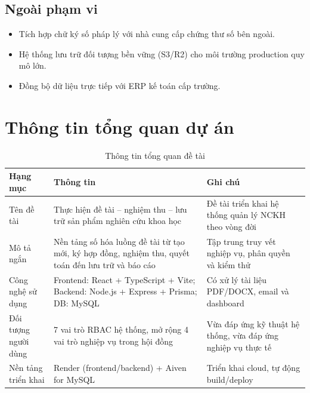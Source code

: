 \documentclass[12pt,a4paper]{report}
\begin{document}
\subsection{Ngoài phạm vi}
\begin{itemize}[leftmargin=1.2cm]
\item Tích hợp chữ ký số pháp lý với nhà cung cấp chứng thư số bên ngoài.
\item Hệ thống lưu trữ đối tượng bền vững (S3/R2) cho môi trường production quy mô lớn.
\item Đồng bộ dữ liệu trực tiếp với ERP kế toán cấp trường.
\end{itemize}

\section{Thông tin tổng quan dự án}
\begin{table}[H]
\centering
\begin{tabular}{|L{3.2cm}|L{5.0cm}|L{5.2cm}|}
\hline
\textbf{Hạng mục} & \textbf{Thông tin} & \textbf{Ghi chú} \\ \hline
Tên đề tài & Thực hiện đề tài -- nghiệm thu -- lưu trữ sản phẩm nghiên cứu khoa học & Đề tài triển khai hệ thống quản lý NCKH theo vòng đời \\ \hline
Mô tả ngắn & Nền tảng số hóa luồng đề tài từ tạo mới, ký hợp đồng, nghiệm thu, quyết toán đến lưu trữ và báo cáo & Tập trung truy vết nghiệp vụ, phân quyền và kiểm thử \\ \hline
Công nghệ sử dụng & Frontend: React + TypeScript + Vite; Backend: Node.js + Express + Prisma; DB: MySQL & Có xử lý tài liệu PDF/DOCX, email và dashboard \\ \hline
Đối tượng người dùng & 7 vai trò RBAC hệ thống, mở rộng 4 vai trò nghiệp vụ trong hội đồng & Vừa đáp ứng kỹ thuật hệ thống, vừa đáp ứng nghiệp vụ thực tế \\ \hline
Nền tảng triển khai & Render (frontend/backend) + Aiven for MySQL & Triển khai cloud, tự động build/deploy \\ \hline
\end{tabular}
\caption{Thông tin tổng quan đề tài}
\end{table}
\end{document}
